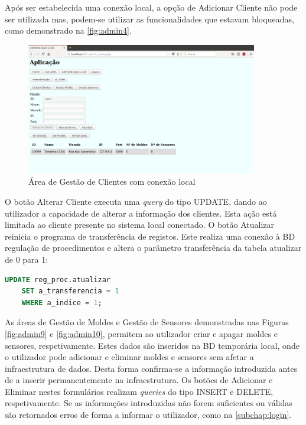 \documentclass[11pt,twoside,a4paper]{report}
\begin{document}
Após ser estabelecida uma conexão local, a opção de Adicionar Cliente não pode ser utilizada mas, podem-se utilizar as funcionalidades que estavam bloqueadas, como demonstrado na \autoref{fig:admin4}.
\begin{figure}[H]
	\begin{center}
		\includegraphics[width=0.9\textwidth]{administracao04} %
		\caption{Área de Gestão de Clientes com conexão local}
		\label{fig:admin4}
	\end{center}
\end{figure}
O botão Alterar Cliente executa uma \textit{query} do tipo UPDATE, dando ao utilizador a capacidade de alterar a informação dos clientes. Esta ação está limitada ao cliente presente no sistema local conectado. O botão Atualizar reinicia o programa de transferência de registos. Este realiza uma conexão à BD regulação de procedimentos e altera o parâmetro transferência da tabela atualizar de 0 para 1:
\begin{lstlisting}[language = SQL]
	UPDATE reg_proc.atualizar
	SET a_transferencia = 1
	WHERE a_indice = 1;
\end{lstlisting} 
As áreas de Gestão de Moldes e Gestão de Sensores demonstradas nas Figuras \ref{fig:admin9} e \ref{fig:admin10}, permitem ao utilizador criar e apagar moldes e sensores, respetivamente. Estes dados são inseridos na BD temporária local, onde o utilizador pode adicionar e eliminar moldes e sensores sem afetar a infraestrutura de dados. Desta forma confirma-se a informação introduzida antes de a inserir permanentemente na infraestrutura. Os botões de Adicionar e Eliminar nestes formulários realizam \textit{queries} do tipo INSERT e DELETE, respetivamente. Se as informações introduzidas não forem suficientes ou válidas são retornados erros de forma a informar o utilizador, como na \autoref{subchap:login}.
\end{document}
